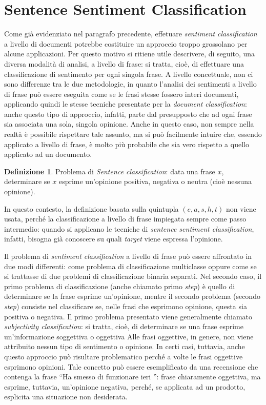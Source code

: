 \documentclass[a4paper,12pt,openright,twoside]{report}
\theoremstyle{definition}
\newtheorem{defi}{Definizione}[section]
\begin{document}
\section{Sentence Sentiment Classification}

Come già evidenziato nel paragrafo precedente, effetuare \emph{sentiment classification}
a livello di documenti potrebbe costituire un approccio troppo grossolano per alcune applicazioni.
Per questo motivo si ritiene utile descrivere, di seguito, una diversa modalità di analisi,
a livello di frase: si tratta, cioè,
di effettuare una classificazione di sentimento per ogni singola frase.
A livello concettuale, non ci sono differenze tra le due metodologie, in quanto
l'analisi dei sentimenti a livello di frase può essere eseguita come se le frasi stesse
fossero interi documenti, applicando quindi le stesse tecniche presentate per la
\emph{document classification}: anche questo tipo di approccio, infatti, parte dal
presupposto
che ad ogni frase sia associata una sola, singola opinione. 
Anche in questo caso, non sempre nella realtà è possibile rispettare tale assunto, 
ma si può facilmente intuire  che, essendo applicato a livello di frase, è molto più 
probabile che sia vero rispetto a quello applicato ad un documento.

\begin{defi}Problema di \emph{Sentence classification}: data una frase $x$, determinare se
	$x$ esprime un'opinione positiva, negativa o neutra (cioè nessuna opinione).
\end{defi}

In questo contesto, la definizione basata sulla quintupla $(e, a, s, h, t)$ non viene usata, 
perché la classificazione a livello di frase impiegata sempre come passo intermedio: 
quando si applicano
le tecniche di \emph{sentence sentiment classification}, infatti, bisogna già conoscere
su quali \emph{target} viene espressa l'opinione.

Il problema di \emph{sentiment classification} a livello di frase può essere affrontato in due
modi differenti: come problema di classificazione multiclasse oppure come se
si trattasse di due problemi di classificazione
binaria separati. Nel secondo caso, il primo problema  di classificazione (anche chiamato primo \emph{step}) è quello di 
determinare se la frase esprime un'opinione, mentre il secondo problema (secondo \emph{step})
consiste nel classificare se, nelle frasi che esprimono opinione, questa sia positiva o negativa.
Il primo problema presentato viene generalmente chiamato \emph{subjectivity classification}:
si tratta, cioè, di 
determinare se una frase esprime un'informazione soggettiva o oggettiva
\citep{Yu2003, Hat2000, Riloff2006} 
Alle
frasi oggettive, in genere,  non viene attribuito nessun tipo di sentimento o opinione.
In certi casi, tuttavia, anche questo approccio può risultare problematico perché a volte
le frasi oggettive esprimono opinioni.
Tale concetto può essere esemplificato da una recensione che contenga
la frase ``Ha smesso di funzionare ieri '':
frase chiaramente oggettiva,
ma esprime, tuttavia, un'opinione negativa, perché, se applicata ad un prodotto, esplicita 
una situazione non desiderata.
\end{document}
